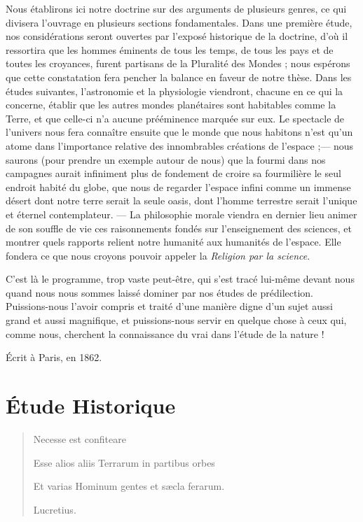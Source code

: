 \documentclass[a4paper, 11pt, oneside]{article}
\begin{document}
Nous établirons ici notre doctrine sur des arguments de plusieurs genres, ce qui divisera l'ouvrage en plusieurs sections fondamentales. Dans une première étude, nos considérations seront ouvertes par l'exposé historique de la doctrine, d'où il ressortira que les hommes éminents de tous les temps, de tous les pays et de toutes les croyances, furent partisans de la Pluralité des Mondes ; nous espérons que cette constatation fera pencher la balance en faveur de notre thèse. Dans les études suivantes, l'astronomie et la physiologie viendront, chacune en ce qui la concerne, établir que les autres mondes planétaires sont habitables comme la Terre, et que celle-ci n'a aucune prééminence marquée sur eux. Le spectacle de l'univers nous fera connaître ensuite que le monde que nous habitons n'est qu'un atome dans l'importance relative des innombrables créations de l'espace ;--- nous saurons (pour prendre un exemple autour de nous) que la fourmi dans nos campagnes aurait infiniment plus de fondement de croire sa fourmilière le seul endroit habité du globe, que nous de regarder l'espace infini comme un immense désert dont notre terre serait la seule oasis, dont l'homme terrestre serait l'unique et éternel contemplateur. --- La philosophie morale viendra en dernier lieu animer de son souffle de vie ces raisonnements fondés sur l'enseignement des sciences, et montrer quels rapports relient notre humanité aux humanités de l'espace. Elle fondera ce que nous croyons pouvoir appeler la \emph{Religion par la science}.

C'est là le programme, trop vaste peut-être, qui s'est tracé lui-même devant nous quand nous nous sommes laissé dominer par nos études de prédilection. Puissions-nous l'avoir compris et traité d'une manière digne d'un sujet aussi grand et aussi magnifique, et puissions-nous servir en quelque chose à ceux qui, comme nous, cherchent la connaissance du vrai dans l'étude de la nature !

\bigskip

Écrit à Paris, en 1862.
\clearpage
\section{Étude Historique}
\begin{quotation}
Necesse est confiteare

Esse alios aliis Terrarum in partibus orbes

Et varias Hominum gentes et sæcla ferarum.

\hspace*{5mm}Lucretius.
\end{quotation}
\end{document}

